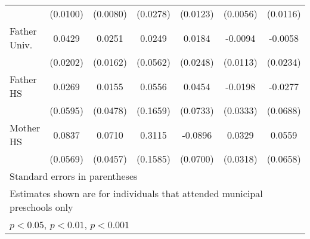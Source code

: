 \begin{table}[htbp]
\begin{tabular}{l*{6}{c}}
            &    (0.0100)         &    (0.0080)         &    (0.0278)         &    (0.0123)         &    (0.0056)         &    (0.0116)         \\
\addlinespace
Father Univ.&      0.0429\sym{*}  &      0.0251         &      0.0249         &      0.0184         &     -0.0094         &     -0.0058         \\
            &    (0.0202)         &    (0.0162)         &    (0.0562)         &    (0.0248)         &    (0.0113)         &    (0.0234)         \\
\addlinespace
Father HS   &      0.0269         &      0.0155         &      0.0556         &      0.0454         &     -0.0198         &     -0.0277         \\
            &    (0.0595)         &    (0.0478)         &    (0.1659)         &    (0.0733)         &    (0.0333)         &    (0.0688)         \\
\addlinespace
Mother HS   &      0.0837         &      0.0710         &      0.3115\sym{*}  &     -0.0896         &      0.0329         &      0.0559         \\
            &    (0.0569)         &    (0.0457)         &    (0.1585)         &    (0.0700)         &    (0.0318)         &    (0.0658)         \\
\bottomrule
\multicolumn{7}{l}{\footnotesize Standard errors in parentheses}\\
\multicolumn{7}{l}{\footnotesize Estimates shown are for individuals that attended municipal preschools only}\\
\multicolumn{7}{l}{\footnotesize \sym{*} \(p<0.05\), \sym{**} \(p<0.01\), \sym{***} \(p<0.001\)}\\
\end{tabular}
\end{table}
